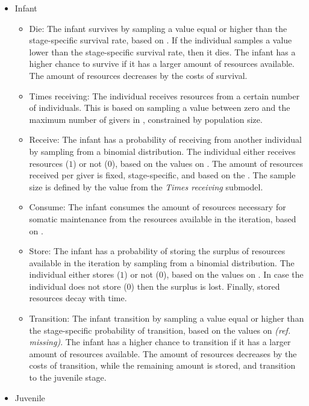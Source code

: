 \documentclass{article}
\begin{document}
\begin{itemize}
    \item Infant
    \begin{itemize}
        \item Die: The infant survives by sampling a value equal or higher than the stage-specific survival rate, based on \cite{gurven2007longevity}. If the individual samples a value lower than the stage-specific survival rate, then it dies. The infant has a higher chance to survive if it has a larger amount of resources available. The amount of resources decreases by the costs of survival.
        \item Times receiving: The individual receives resources from a certain number of individuals. This is based on sampling a value between zero and the maximum number of givers in \cite{gurven2004give}, constrained by population size.
        \item Receive: The infant has a probability of receiving from another individual by sampling from a binomial distribution. The individual either receives resources ($1$) or not ($0$), based on the values on \cite{gurven2004give}. The amount of resources received per giver is fixed, stage-specific, and based on the \cite{gurven2004give}. The sample size is defined by the value from the \emph{Times receiving} submodel. 
        \item Consume: The infant consumes the amount of resources necessary for somatic maintenance from the resources available in the iteration, based on \cite{kaplan2000theory}.
        \item Store: The infant has a probability of storing the surplus of resources available in the iteration by sampling from a binomial distribution. The individual either stores ($1$) or not ($0$), based on the values on \citep{bowles2011cultivation}. In case the individual does not store ($0$) then the surplus is lost. Finally, stored resources decay with time.
        \item Transition: The infant transition by sampling a value equal or higher than the stage-specific probability of transition, based on the values on \emph{(ref. missing)}. The infant has a higher chance to transition if it has a larger amount of resources available. The amount of resources decreases by the costs of transition, while the remaining amount is stored, and transition to the juvenile stage.
    \end{itemize}
    \item Juvenile
    \begin{itemize}

\end{itemize}
\end{itemize}
\end{document}
